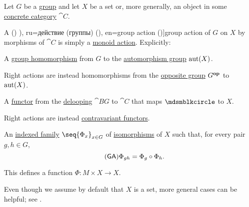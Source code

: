 \begin{definition}\label{def:group_action}\mimprovised
  Let \( G \) be a \hyperref[def:group]{group} and let \( X \) be a set or, more generally, an object in some \hyperref[def:concrete_category]{concrete category} \( \cat{C} \).

  A () \term[bg=действие (на група) (\cite[def. IV.18]{ГеновМиховскиМоллов1991Алгебра}), ru=действие (группы) (\cite[98]{Тыртышников2017ОсновыАлгебры}), en=group action (\cite[108]{Aluffi2009Algebra})]{group action} of \( G \) on \( X \) by morphisms of \( \cat{C} \) is simply a \hyperref[def:monoid_action]{monoid action}. Explicitly:
  \begin{thmenum}
     A \hyperref[def:group/homomorphism]{group homomorphism} from \( G \) to the \hyperref[def:automorphism_group]{automorphism group} \( \operatorname{aut}(X) \).

    Right actions are instead homomorphisms from the \hyperref[def:group/opposite]{opposite group} \( G^\oppos \) to \( \operatorname{aut}(X) \).

     A \hyperref[def:functor]{functor} from the \hyperref[def:monoid_delooping]{delooping} \( \cat{B} G \) to \( \cat{C} \) that maps \( \Anon \) to \( X \).

    Right actions are instead \hyperref[rem:contravariant_functor]{contravariant functors}.

     An \hyperref[def:indexed_family]{indexed family} \( \seq{ \Phi_x }_{x \in G} \) of \hyperref[def:morphism_invertibility/isomorphism]{isomorphisms} of \( X \) such that, for every pair \( g, h \in G \),
    \begin{equation}\label{eq:def:group_action/family/compatibility}\tag{\logic{GA}}
      \Phi_{gh} = \Phi_g \bincirc \Phi_h.
    \end{equation}

    This defines a function \( \Phi: M \times X \to X \).
  \end{thmenum}
\end{definition}
\begin{comments}
  \item Even though we assume by default that \( X \) is a set, more general cases can be helpful; see .
\end{comments}

